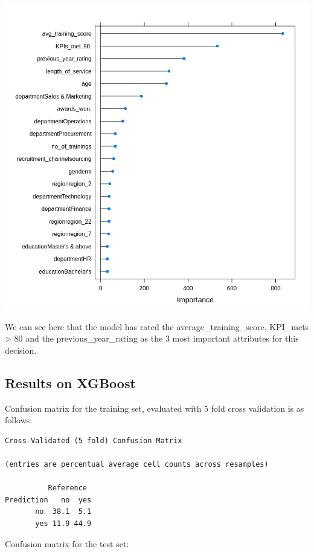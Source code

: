 \documentclass[
]{article}
\let\origfigure\figure
\let\endorigfigure\endfigure
\renewenvironment{figure}[1][2] {
    \expandafter\origfigure\expandafter[H]
} {
    \endorigfigure
}
\begin{document}
\begin{figure}
\centering
\includegraphics{./imgs/rf_feat_imp.png}
\caption{Plot of feature importance according to Random Forest}
\end{figure}

We can see here that the model has rated the average\_training\_score,
KPI\_mets \textgreater{} 80 and the previous\_year\_rating as the 3 most
important attributes for this decision.

\hypertarget{results-on-xgboost}{%
\subsection{Results on XGBoost}\label{results-on-xgboost}}

Confusion matrix for the training set, evaluated with 5 fold cross
validation is as follows:

\begin{verbatim}
Cross-Validated (5 fold) Confusion Matrix 

(entries are percentual average cell counts across resamples)
 
          Reference
Prediction   no  yes
       no  38.1  5.1
       yes 11.9 44.9
\end{verbatim}

Confusion matrix for the test set:
\end{document}
